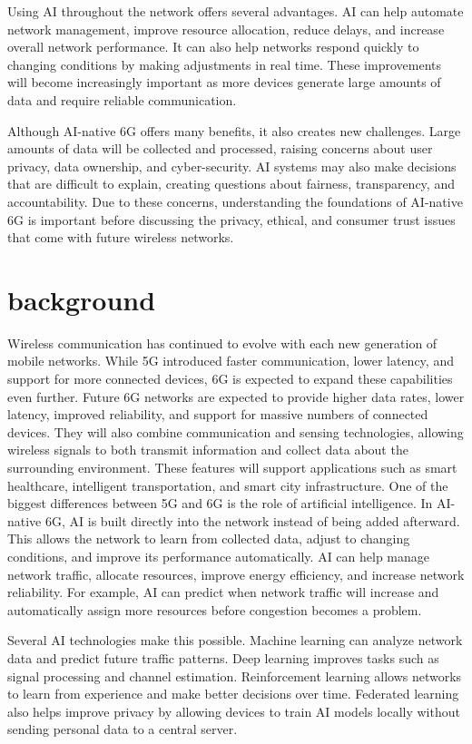 \documentclass[letterpaper]{article}
\begin{document}
Using AI throughout the network offers several advantages. AI can help automate network management, improve resource allocation, reduce delays, and increase overall network performance. It can also help networks respond quickly to changing conditions by making adjustments in real time. These improvements will become increasingly important as more devices generate large amounts of data and require reliable communication.

Although AI-native 6G offers many benefits, it also creates new challenges. Large amounts of data will be collected and processed, raising concerns about user privacy, data ownership, and cyber-security. AI systems may also make decisions that are difficult to explain, creating questions about fairness, transparency, and accountability. Due to these concerns, understanding the foundations of AI-native 6G is important before discussing the privacy, ethical, and consumer trust issues that come with future wireless networks.

\section{background}
Wireless communication has continued to evolve with each new generation of mobile networks. While 5G introduced faster communication, lower latency, and support for more connected devices, 6G is expected to expand these capabilities even further. Future 6G networks are expected to provide higher data rates, lower latency, improved reliability, and support for massive numbers of connected devices. They will also combine communication and sensing technologies, allowing wireless signals to both transmit information and collect data about the surrounding environment. These features will support applications such as smart healthcare, intelligent transportation, and smart city infrastructure.
One of the biggest differences between 5G and 6G is the role of artificial intelligence. In AI-native 6G, AI is built directly into the network instead of being added afterward. This allows the network to learn from collected data, adjust to changing conditions, and improve its performance automatically. AI can help manage network traffic, allocate resources, improve energy efficiency, and increase network reliability. For example, AI can predict when network traffic will increase and automatically assign more resources before congestion becomes a problem.

Several AI technologies make this possible. Machine learning can analyze network data and predict future traffic patterns. Deep learning improves tasks such as signal processing and channel estimation. Reinforcement learning allows networks to learn from experience and make better decisions over time. Federated learning also helps improve privacy by allowing devices to train AI models locally without sending personal data to a central server.
\end{document}
